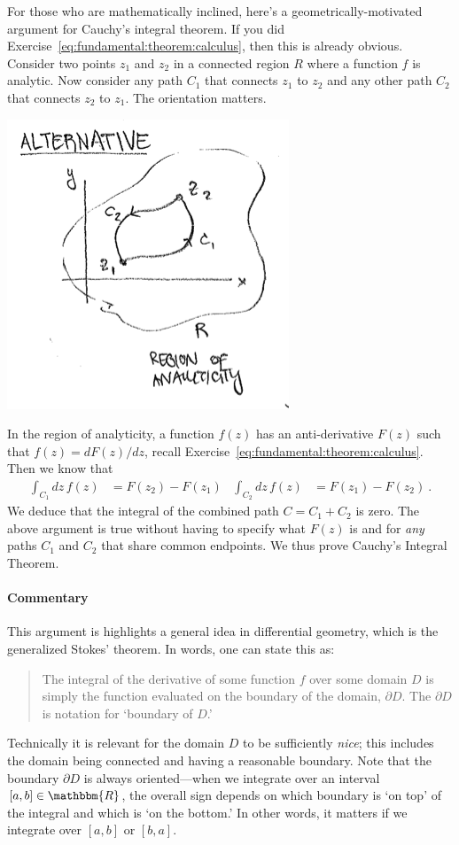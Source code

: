 For those who are mathematically inclined, here's a geometrically-motivated argument for Cauchy's integral theorem. If you did Exercise~\eqref{eq:fundamental:theorem:calculus}, then this is already obvious. Consider two points $z_1$ and $z_2$ in a connected region $R$ where a function $f$ is analytic. Now consider any path $C_1$ that connects $z_1$ to $z_2$ and any other path $C_2$ that connects $z_2$ to $z_1$. The orientation matters.
\begin{center}
\includegraphics[width=.5\textwidth]{figures/Lec_2017_paths.png}
\end{center}
In the region of analyticity, a function $f(z)$ has an anti-derivative $F(z)$ such that $f(z) = dF(z)/dz$, recall Exercise~\ref{eq:fundamental:theorem:calculus}. Then we know that
\begin{align}
  \int_{C_1} dz\, f(z) &= F(z_2) - F(z_1)
  &
  \int_{C_2} dz\, f(z) &= F(z_1) - F(z_2) \ .
\end{align}
We deduce that the integral of the combined path $C=C_1+C_2$ is zero. The above argument is true without having to specify what $F(z)$ is and for \emph{any} paths $C_1$ and $C_2$ that share common endpoints. We thus prove Cauchy's Integral Theorem.

\paragraph{Commentary}
This argument is highlights a general idea in differential geometry, which is the generalized Stokes' theorem. In words, one can state this as:
\begin{quote}
The integral of the derivative of some function $f$ over some domain $D$ is simply the function evaluated on the boundary of the domain, $\partial D$. The $\partial D$ is notation for `boundary of $D$.'
\end{quote}
Technically it is relevant for the domain $D$ to be sufficiently \emph{nice}; this includes the domain being connected and having a reasonable boundary. Note that the boundary $\partial D$ is always oriented---when we integrate over an interval $[a,b]\in \mathbbm{R}$, the overall sign depends on which boundary is `on top' of the integral and which is `on the bottom.' In other words, it matters if we integrate over $[a,b]$ or $[b,a]$. 

